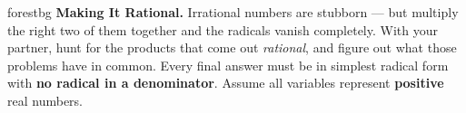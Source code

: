 \documentclass[10pt]{article}
\begin{document}
\namepartnerperiod

\vspace{0.08in}

\begin{headlinebox}{forestbg}
\small\textbf{Making It Rational.} Irrational numbers are stubborn --- but multiply the right two
of them together and the radicals vanish completely. With your partner, hunt for the products that
come out \emph{rational}, and figure out what those problems have in common. Every final answer
must be in simplest radical form with \textbf{no radical in a denominator}. Assume all variables
represent \textbf{positive} real numbers.
\end{headlinebox}

\vspace{0.06in}
\end{document}
